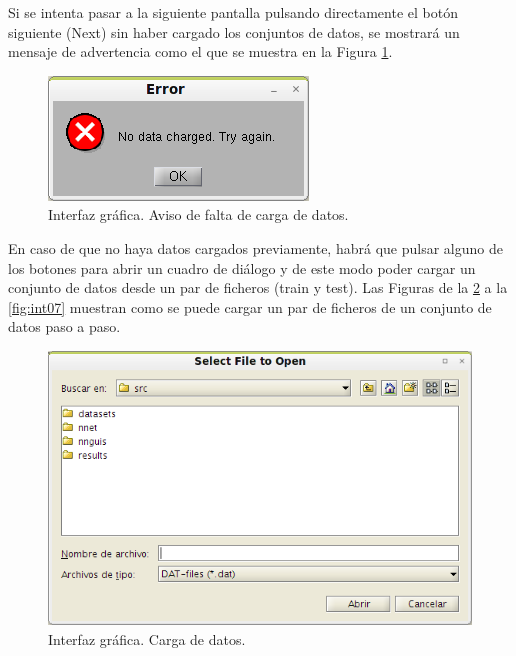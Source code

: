 		Si se intenta pasar a la siguiente pantalla pulsando directamente el botón siguiente (Next) sin haber cargado los conjuntos de datos, se mostrará un mensaje de advertencia como el que se muestra en la Figura \ref{fig:int02-1}.\\
		
		\begin{figure}[htbp]
			\centering
			\includegraphics[scale=1]{interfaz/interface02-1.png}
			\caption{Interfaz gráfica. Aviso de falta de carga de datos.}
			\label{fig:int02-1}
		\end{figure}
		
		En caso de que no haya datos cargados previamente, habrá que pulsar alguno de los botones para abrir un cuadro de diálogo y de este modo poder cargar un conjunto de datos desde un par de ficheros (train y test). Las Figuras de la \ref{fig:int03} a la \ref{fig:int07} muestran como se puede cargar un par de ficheros de un conjunto de datos paso a paso.\\
		
		\begin{figure}[htbp]
			\centering
			\includegraphics[scale=0.6]{interfaz/interface03.png}
			\caption{Interfaz gráfica. Carga de datos.}
			\label{fig:int03}
		\end{figure}
		
